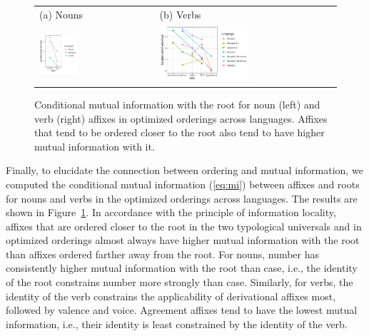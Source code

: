 \documentclass[man]{apa7}
\begin{document}
\begin{figure}
    \centering
    \begin{tabular}{lll}
    (a) Nouns & (b) Verbs \\ 
    \includegraphics[width=0.35\textwidth]{figures/visualizeCPMI_R_nouns.pdf} &
    \includegraphics[width=0.55\textwidth]{figures/visualizeCPMI_R_verbs.pdf}
    \end{tabular}
    \caption{Conditional mutual information with the root for noun (left) and verb (right) affixes in optimized orderings across languages. Affixes that tend to be ordered closer to the root also tend to have higher mutual information with it.}
    \label{fig:cmis}
\end{figure}

Finally, to elucidate the connection between ordering and mutual information, we computed the conditional mutual information (\ref{eq:mi}) between affixes and roots for nouns and verbs in the optimized orderings across languages.
The results are shown in Figure~\ref{fig:cmis}.
In accordance with the principle of information locality, affixes that are ordered closer to the root in the two typological universals and in optimized orderings almost always have higher mutual information with the root than affixes ordered farther away from the root.
For nouns, number has consistently higher mutual information with the root than case, i.e., the identity of the root constrains number more strongly than case.
Similarly, for verbs, the identity of the verb constrains the applicability of derivational affixes most, followed by valence and voice.
Agreement affixes tend to have the lowest mutual information, i.e., their identity is least constrained by the identity of the verb.
\end{document}
